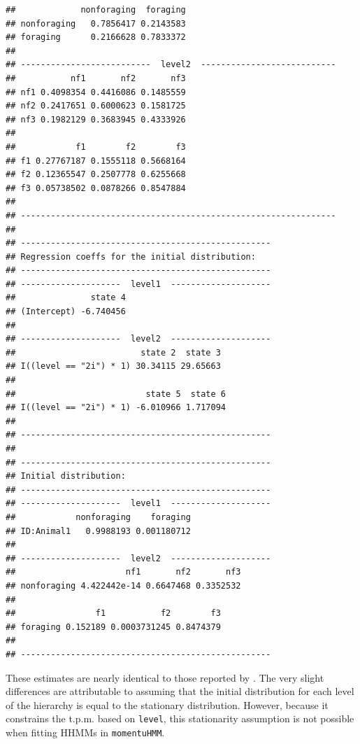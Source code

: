 \documentclass[12pt]{article}\usepackage[]{graphicx}\usepackage[]{xcolor}
\makeatletter
\newenvironment{kframe}{%
 \def\at@end@of@kframe{}%
 \ifinner\ifhmode%
  \def\at@end@of@kframe{\end{minipage}}%
  \begin{minipage}{\columnwidth}%
 \fi\fi%
 \def\FrameCommand##1{\hskip\@totalleftmargin \hskip-\fboxsep
 \colorbox{shadecolor}{##1}\hskip-\fboxsep
     \hskip-\linewidth \hskip-\@totalleftmargin \hskip\columnwidth}%
 \MakeFramed {\advance\hsize-\width
   \@totalleftmargin\z@ \linewidth\hsize
   \@setminipage}}%
 {\par\unskip\endMakeFramed%
 \at@end@of@kframe}
\newenvironment{knitrout}{}{} %
\makeatother
\begin{document}
\begin{knitrout}
\begin{kframe}
\begin{verbatim}
##             nonforaging  foraging
## nonforaging   0.7856417 0.2143583
## foraging      0.2166628 0.7833372
## 
## --------------------------  level2  ---------------------------
##           nf1       nf2       nf3
## nf1 0.4098354 0.4416086 0.1485559
## nf2 0.2417651 0.6000623 0.1581725
## nf3 0.1982129 0.3683945 0.4333926
## 
##            f1        f2        f3
## f1 0.27767187 0.1555118 0.5668164
## f2 0.12365547 0.2507778 0.6255668
## f3 0.05738502 0.0878266 0.8547884
## 
## ---------------------------------------------------------------
## 
## --------------------------------------------------
## Regression coeffs for the initial distribution:
## --------------------------------------------------
## --------------------  level1  --------------------
##               state 4
## (Intercept) -6.740456
## 
## --------------------  level2  --------------------
##                         state 2  state 3
## I((level == "2i") * 1) 30.34115 29.65663
## 
##                          state 5  state 6
## I((level == "2i") * 1) -6.010966 1.717094
## 
## --------------------------------------------------
## 
## --------------------------------------------------
## Initial distribution:
## --------------------------------------------------
## --------------------  level1  --------------------
##            nonforaging    foraging
## ID:Animal1   0.9988193 0.001180712
## 
## --------------------  level2  --------------------
##                      nf1       nf2       nf3
## nonforaging 4.422442e-14 0.6647468 0.3352532
## 
##                f1           f2        f3
## foraging 0.152189 0.0003731245 0.8474379
## 
## --------------------------------------------------
\end{verbatim}
\end{kframe}
\end{knitrout}
\noindent These estimates are nearly identical to those reported by \cite{Leos-BarajasEtAl2017}.  The very slight differences are attributable to \cite{Leos-BarajasEtAl2017} assuming that the initial distribution for each level of the hierarchy is equal to the stationary distribution. However, because it constrains the t.p.m. based on \verb|level|, this stationarity assumption is not possible when fitting HHMMs in \verb|momentuHMM|.  
\end{document}
